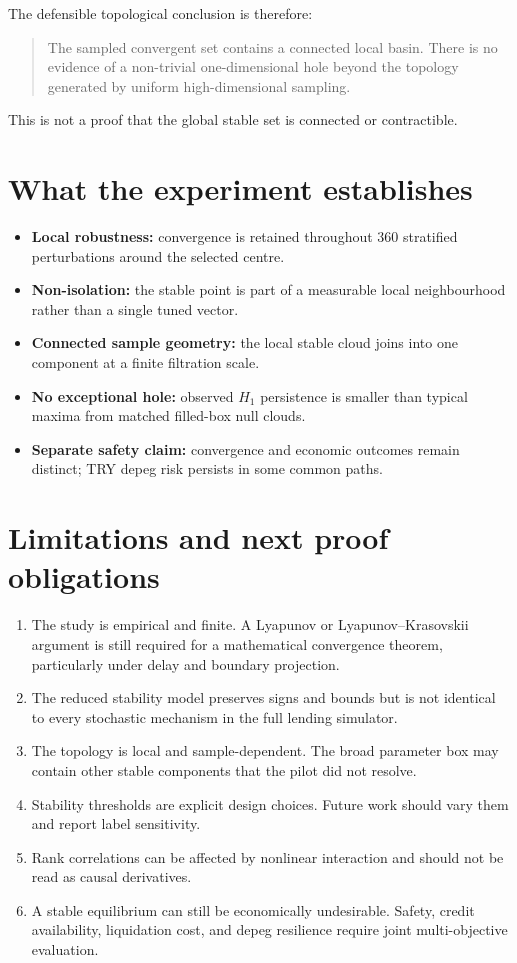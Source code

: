 \documentclass[11pt,a4paper]{article}
\begin{document}
The defensible topological conclusion is therefore:
\begin{quote}
The sampled convergent set contains a connected local basin. There is no
evidence of a non-trivial one-dimensional hole beyond the topology generated by
uniform high-dimensional sampling.
\end{quote}
This is not a proof that the global stable set is connected or contractible.

\section{What the experiment establishes}

\begin{itemize}
\item \textbf{Local robustness:} convergence is retained throughout 360
stratified perturbations around the selected centre.
\item \textbf{Non-isolation:} the stable point is part of a measurable local
neighbourhood rather than a single tuned vector.
\item \textbf{Connected sample geometry:} the local stable cloud joins into one
component at a finite filtration scale.
\item \textbf{No exceptional hole:} observed \(H_1\) persistence is smaller than
typical maxima from matched filled-box null clouds.
\item \textbf{Separate safety claim:} convergence and economic outcomes remain
distinct; TRY depeg risk persists in some common paths.
\end{itemize}

\section{Limitations and next proof obligations}

\begin{enumerate}
\item The study is empirical and finite. A Lyapunov or
Lyapunov--Krasovskii argument is still required for a mathematical convergence
theorem, particularly under delay and boundary projection.
\item The reduced stability model preserves signs and bounds but is not identical
to every stochastic mechanism in the full lending simulator.
\item The topology is local and sample-dependent. The broad parameter box may
contain other stable components that the pilot did not resolve.
\item Stability thresholds are explicit design choices. Future work should vary
them and report label sensitivity.
\item Rank correlations can be affected by nonlinear interaction and should not
be read as causal derivatives.
\item A stable equilibrium can still be economically undesirable. Safety,
credit availability, liquidation cost, and depeg resilience require joint
multi-objective evaluation.
\end{enumerate}
\end{document}
